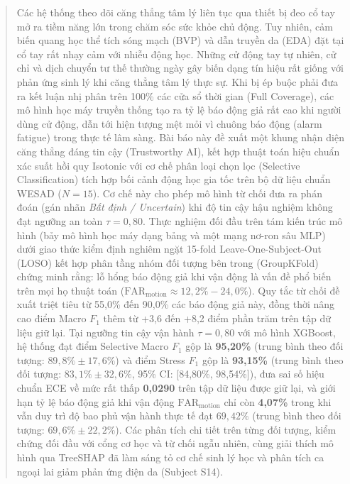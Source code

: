\documentclass[conference]{IEEEtran}
\begin{document}
\begin{abstract}
Các hệ thống theo dõi căng thẳng tâm lý liên tục qua thiết bị đeo cổ tay mở ra tiềm năng lớn trong chăm sóc sức khỏe chủ động. Tuy nhiên, cảm biến quang học thể tích sóng mạch (BVP) và dẫn truyền da (EDA) đặt tại cổ tay rất nhạy cảm với nhiễu động học. Những cử động tay tự nhiên, cử chỉ và dịch chuyển tư thế thường ngày gây biến dạng tín hiệu rất giống với phản ứng sinh lý khi căng thẳng tâm lý thực sự. Khi bị ép buộc phải đưa ra kết luận nhị phân trên 100\% các cửa sổ thời gian (Full Coverage), các mô hình học máy truyền thống tạo ra tỷ lệ báo động giả rất cao khi người dùng cử động, dẫn tới hiện tượng mệt mỏi vì chuông báo động (alarm fatigue) trong thực tế lâm sàng. Bài báo này đề xuất một khung nhận diện căng thẳng đáng tin cậy (Trustworthy AI), kết hợp thuật toán hiệu chuẩn xác suất hồi quy Isotonic với cơ chế phân loại chọn lọc (Selective Classification) tích hợp bối cảnh động học gia tốc trên bộ dữ liệu chuẩn WESAD ($N=15$). Cơ chế này cho phép mô hình từ chối đưa ra phán đoán (gán nhãn \textit{Bất định / Uncertain}) khi độ tin cậy hậu nghiệm không đạt ngưỡng an toàn $\tau = 0,80$. Thực nghiệm đối đầu trên tám kiến trúc mô hình (bảy mô hình học máy dạng bảng và một mạng nơ-ron sâu MLP) dưới giao thức kiểm định nghiêm ngặt 15-fold Leave-One-Subject-Out (LOSO) kết hợp phân tầng nhóm đối tượng bên trong (GroupKFold) chứng minh rằng: lỗ hổng báo động giả khi vận động là vấn đề phổ biến trên mọi họ thuật toán ($\text{FAR}_{\text{motion}} \approx 12,2\% - 24,0\%$). Quy tắc từ chối đề xuất triệt tiêu từ 55,0\% đến 90,0\% các báo động giả này, đồng thời nâng cao điểm Macro $F_1$ thêm từ +3,6 đến +8,2 điểm phần trăm trên tập dữ liệu giữ lại. Tại ngưỡng tin cậy vận hành $\tau = 0,80$ với mô hình XGBoost, hệ thống đạt điểm Selective Macro $F_1$ gộp là \textbf{95,20\%} (trung bình theo đối tượng: $89,8\% \pm 17,6\%$) và điểm Stress $F_1$ gộp là \textbf{93,15\%} (trung bình theo đối tượng: $83,1\% \pm 32,6\%$, 95\% CI: [84,80\%, 98,54\%]), đưa sai số hiệu chuẩn ECE về mức rất thấp \textbf{0,0290} trên tập dữ liệu được giữ lại, và giới hạn tỷ lệ báo động giả khi vận động $\text{FAR}_{\text{motion}}$ chỉ còn \textbf{4,07\%} trong khi vẫn duy trì độ bao phủ vận hành thực tế đạt $69,42\%$ (trung bình theo đối tượng: $69,6\% \pm 22,2\%$). Các phân tích chi tiết trên từng đối tượng, kiểm chứng đối đầu với cổng cơ học và từ chối ngẫu nhiên, cùng giải thích mô hình qua TreeSHAP đã làm sáng tỏ cơ chế sinh lý học và phân tích ca ngoại lai giảm phản ứng điện da (Subject S14).
\end{abstract}
\end{document}
